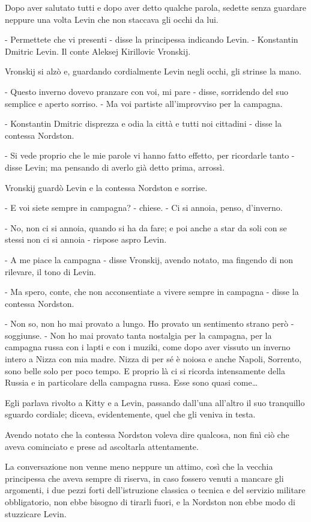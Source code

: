 Dopo aver salutato tutti e dopo aver detto qualche parola, sedette senza guardare neppure una volta Levin che non staccava gli occhi da lui. 

- Permettete che vi presenti - disse la principessa indicando Levin. - Konstantin Dmitric Levin. Il conte Aleksej Kirillovic Vronskij. 

Vronskij si alzò e, guardando cordialmente Levin negli occhi, gli strinse la mano. 

- Questo inverno dovevo pranzare con voi, mi pare - disse, sorridendo del suo semplice e aperto sorriso. - Ma voi partiste all'improvviso per la campagna. 

- Konstantin Dmitric disprezza e odia la città e tutti noi cittadini - disse la contessa Nordston. 

- Si vede proprio che le mie parole vi hanno fatto effetto, per ricordarle tanto - disse Levin; ma pensando di averlo già detto prima, arrossì. 

Vronskij guardò Levin e la contessa Nordston e sorrise. 

- E voi siete sempre in campagna? - chiese. - Ci si annoia, penso, d'inverno. 

- No, non ci si annoia, quando si ha da fare; e poi anche a star da soli con se stessi non ci si annoia - rispose aspro Levin. 

- A me piace la campagna - disse Vronskij, avendo notato, ma fingendo di non rilevare, il tono di Levin. 

- Ma spero, conte, che non acconsentiate a vivere sempre in campagna - disse la contessa Nordston. 

- Non so, non ho mai provato a lungo. Ho provato un sentimento strano però - soggiunse. - Non ho mai provato tanta nostalgia per la campagna, per la campagna russa con i lapti e con i muziki, come dopo aver vissuto un inverno intero a Nizza con mia madre. Nizza di per sé è noiosa e anche Napoli, Sorrento, sono belle solo per poco tempo. E proprio là ci si ricorda intensamente della Russia e in particolare della campagna russa. Esse sono quasi come\ldots{} 

Egli parlava rivolto a Kitty e a Levin, passando dall'una all'altro il suo tranquillo sguardo cordiale; diceva, evidentemente, quel che gli veniva in testa. 

Avendo notato che la contessa Nordston voleva dire qualcosa, non finì ciò che aveva cominciato e prese ad ascoltarla attentamente. 

La conversazione non venne meno neppure un attimo, così che la vecchia principessa che aveva sempre di riserva, in caso fossero venuti a mancare gli argomenti, i due pezzi forti dell'istruzione classica o tecnica e del servizio militare obbligatorio, non ebbe bisogno di tirarli fuori, e la Nordston non ebbe modo di stuzzicare Levin. 

